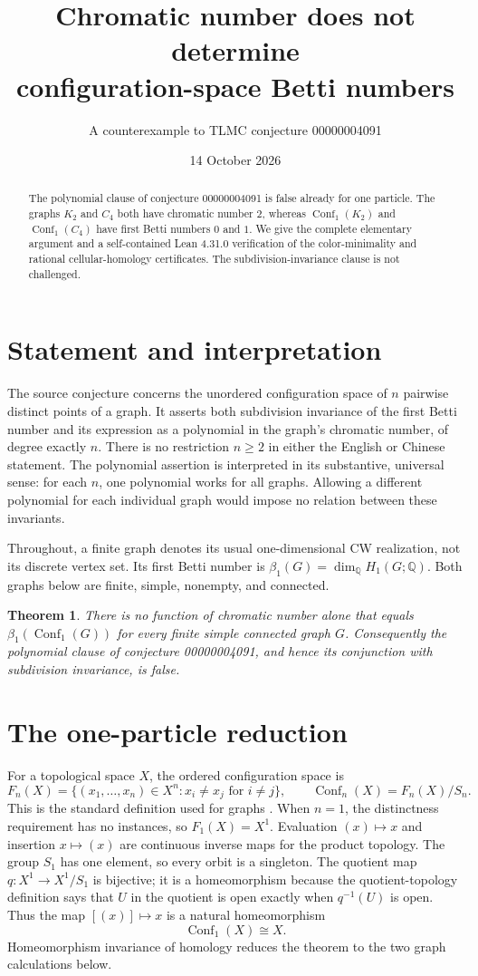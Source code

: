 \documentclass[11pt]{article}
\title{Chromatic number does not determine\\ configuration-space Betti numbers}
\author{A counterexample to TLMC conjecture 00000004091}
\date{14 October 2026}
\newtheorem{theorem}{Theorem}
\newcommand{\Conf}{\operatorname{Conf}}
\newcommand{\Q}{\mathbb{Q}}
\begin{document}
\maketitle
\begin{abstract}
The polynomial clause of conjecture 00000004091 is false already for one
particle. The graphs $K_2$ and $C_4$ both have chromatic number $2$, whereas
$\Conf_1(K_2)$ and $\Conf_1(C_4)$ have first Betti numbers $0$ and $1$.
We give the complete elementary argument and a self-contained Lean 4.31.0
verification of the color-minimality and rational cellular-homology
certificates. The subdivision-invariance clause is not challenged.
\end{abstract}

\section{Statement and interpretation}
The source conjecture \cite{tlmc} concerns the unordered configuration space
of $n$ pairwise distinct points of a graph. It asserts both subdivision
invariance of the first Betti number and its expression as a polynomial in
the graph's chromatic number, of degree exactly $n$.
There is no restriction $n\geq 2$ in either the English or Chinese statement.
The polynomial assertion is interpreted in its substantive, universal sense:
for each $n$, one polynomial works for all graphs. Allowing a different
polynomial for each individual graph would impose no relation between these
invariants.

Throughout, a finite graph denotes its usual one-dimensional CW realization,
not its discrete vertex set. Its first Betti number is
$\beta_1(G)=\dim_{\Q}H_1(G;\Q)$.
Both graphs below are finite, simple, nonempty, and connected.

\begin{theorem}
There is no function of chromatic number alone that equals
$\beta_1(\Conf_1(G))$ for every finite simple connected graph $G$.
Consequently the polynomial clause of conjecture 00000004091, and hence
its conjunction with subdivision invariance, is false.
\end{theorem}

\section{The one-particle reduction}
For a topological space $X$, the ordered configuration space is
\[
 F_n(X)=\{(x_1,\ldots,x_n)\in X^n:x_i\ne x_j\text{ for }i\ne j\},
 \qquad \Conf_n(X)=F_n(X)/S_n.
\]
This is the standard definition used for graphs \cite[p.~2]{scheirer}.
When $n=1$, the distinctness requirement has no instances, so $F_1(X)=X^1$.
Evaluation $(x)\mapsto x$ and insertion $x\mapsto(x)$ are continuous inverse
maps for the product topology. The group $S_1$ has one element, so every
orbit is a singleton. The quotient map $q:X^1\to X^1/S_1$ is bijective;
it is a homeomorphism because the quotient-topology definition says that
$U$ in the quotient is open exactly when $q^{-1}(U)$ is open. Thus the map
$[(x)]\mapsto x$ is a natural homeomorphism
\[
                         \Conf_1(X)\cong X.
\]
Homeomorphism invariance of homology reduces the theorem to the two graph
calculations below.
\end{document}
